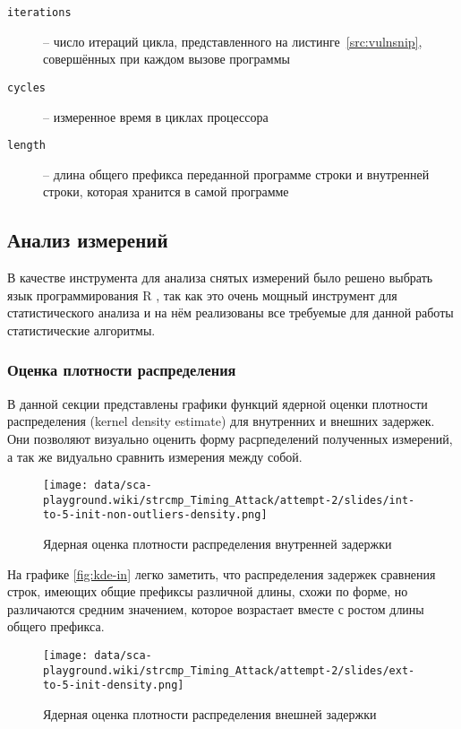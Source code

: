 \begin{description}
\item [\texttt{iterations}] -- число итераций цикла, представленного на
  листинге~\ref{src:vulnsnip}, совершённых при каждом вызове программы 
\item [\texttt{cycles}] -- измеренное время в циклах процессора
\item [\texttt{length}] -- длина общего префикса переданной программе  строки и
  внутренней строки, которая хранится в самой программе
\end{description}

\subsection{Анализ измерений}

В качестве инструмента для анализа снятых измерений было решено выбрать язык программирования
R \cite{r}, так как это очень мощный инструмент для статистического анализа и на нём реализованы
все требуемые для данной работы статистические алгоритмы.

\subsubsection{Оценка плотности распределения}

В данной секции представлены графики функций ядерной оценки плотности
распределения (kernel density estimate) для внутренних и внешних задержек.
Они позволяют визуально оценить форму расрпеделений полученных измерений, а так же
видуально сравнить измерения между собой.

\begin{figure}
    \centering
    \texttt{[image: data/sca-playground.wiki/strcmp\_Timing\_Attack/attempt-2/slides/int-to-5-init-non-outliers-density.png]}
    \caption{Ядерная оценка плотности распределения внутренней задержки}
\end{figure} \label{fig:kde-in}

На графике \ref{fig:kde-in} легко заметить, что распределения задержек сравнения
строк, имеющих общие префиксы различной длины, схожи по форме, но различаются
средним значением, которое возрастает вместе с ростом длины общего префикса.

\begin{figure}
    \centering
    \texttt{[image: data/sca-playground.wiki/strcmp\_Timing\_Attack/attempt-2/slides/ext-to-5-init-density.png]}
    \caption{Ядерная оценка плотности распределения внешней задержки}
\end{figure} \label{fig:kde-out}

